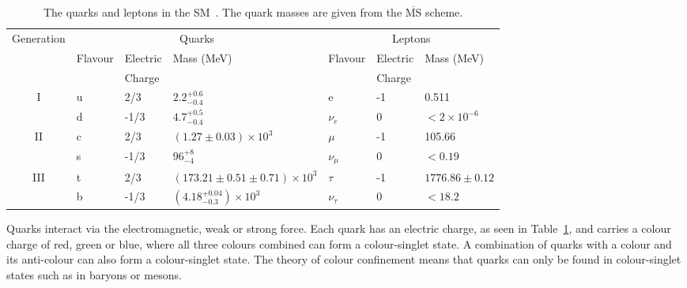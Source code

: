 \vspace{0.8cm}
\begin{table}[ht!]
\centering
\footnotesize
\begin{tabular}{|c|l|l|l|l|l|l|}
\hline
\multirow{2}{*}{Generation} & \multicolumn{3}{c|}{Quarks}                             & \multicolumn{3}{c|}{Leptons}              \\ \cline{2-7} 
                            & Flavour & Electric & Mass (MeV)                           & Flavour      & Electric & Mass (MeV)        \\
                            & & Charge &                            &       & Charge &         \\ \hline

\hline

\multirow{2}{*}{I}          & u       & 2/3    & $2.2^{+0.6}_{-0.4}$                  & e            & -1     & 0.511             \\
                            & d       & -1/3   & $4.7^{+0.5}_{-0.4}$                  & $\nu_{e}$    & 0      & $<2\times10^{-6}$ \\ \hline
\multirow{2}{*}{II}         & c       & 2/3    & $(1.27\pm 0.03)\times10^{3}$         & $\mu$        & -1     & 105.66            \\
                            & s       & -1/3   & $96^{+8}_{-4}$                       & $\nu_{\mu}$  & 0      & $<0.19$           \\ \hline
\multirow{2}{*}{III}        & t       & 2/3    & $(173.21\pm0.51\pm0.71)\times10^{3}$ & $\tau$       & -1     & $1776.86\pm0.12$  \\
                            & b       & -1/3   & $(4.18^{+0.04}_{-0.3})\times10^{3}$  & $\nu_{\tau}$ & 0      & $<18.2$           \\ \hline
\end{tabular}
\caption{The quarks and leptons in the SM~\cite{PDG2016}. The quark masses are given from the $\overline{\textrm{MS}}$ scheme. }
\label{table:SMmatter}

\end{table}
Quarks interact via the electromagnetic, weak or strong force. Each quark has an electric charge, as seen in Table~\ref{table:SMmatter}, and carries a colour charge of red, green or blue, where all three colours combined can form a colour-singlet state. A combination of quarks with a colour and its anti-colour can also form a colour-singlet state. The theory of colour confinement means that quarks can only be found in colour-singlet states such as in baryons or mesons. 

